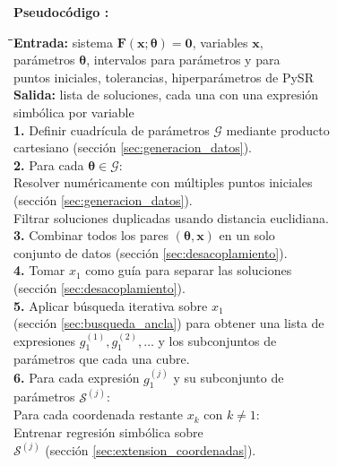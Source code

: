 \documentclass[12pt,a4paper]{article} \usepackage[utf8]{inputenc} \usepackage[spanish]{babel} \usepackage{amsmath, amssymb, amsthm} \usepackage{bm} \usepackage{float} \usepackage{longtable} \usepackage[hidelinks]{hyperref}
\newcommand{\xvec}{\mathbf{x}} \newcommand{\thetavec}{\boldsymbol{\theta}} \newcommand{\Fvec}{\mathbf{F}} \newcommand{\R}{\mathbb{R}} \newcommand{\norm}[1]{\left\lVert#1\right\rVert} \newcommand{\loss}{\mathcal{L}} \newcommand{\dataset}{\mathcal{D}} \newcommand{\jac}{\mathbf{J}}
\begin{document}
\medskip {}\label{alg:proceso_principal} \noindent\textbf{Pseudocódigo \thepseudocode:}
\begin{tabbing}
\qquad \= \qquad \= \qquad \= \kill \textbf{Entrada:} \>\>\> sistema \(\Fvec(\xvec; \thetavec) = \mathbf{0}\), variables \(\xvec\), \\
\>\>\> parámetros \(\thetavec\), intervalos para parámetros y para \\
\>\>\> puntos iniciales, tolerancias, hiperparámetros de PySR \\ \textbf{Salida:} \>\>\> lista de soluciones, cada una con una expresión \\
\>\>\> simbólica por variable \\[4pt] \textbf{1.} \> Definir cuadrícula de parámetros \(\mathcal{G}\) mediante producto \\
\> cartesiano (sección \ref{sec:generacion_datos}). \\
\textbf{2.} \> Para cada \(\thetavec \in \mathcal{G}\): \\
\> \qquad Resolver numéricamente con múltiples puntos iniciales \\ \> \qquad (sección \ref{sec:generacion_datos}). \\ \> \qquad Filtrar soluciones duplicadas usando distancia euclidiana. \\
\textbf{3.} \> Combinar todos los pares \((\thetavec, \xvec)\) en un solo \\
\> conjunto de datos (sección \ref{sec:desacoplamiento}). \\
\textbf{4.} \> Tomar \(x_1\) como guía para separar las soluciones \\
\> (sección \ref{sec:desacoplamiento}). \\
\textbf{5.} \> Aplicar búsqueda iterativa sobre \(x_1\) \\
\> (sección \ref{sec:busqueda_ancla}) para obtener una lista de \\
\> expresiones \(g_1^{(1)}, g_1^{(2)}, \dots\) y los subconjuntos de \\
\> parámetros que cada una cubre. \\
\textbf{6.} \> Para cada expresión \(g_1^{(j)}\) y su subconjunto de \\
\> parámetros \(\mathcal{S}^{(j)}\): \\
\> \qquad Para cada coordenada restante \(x_k\) con \(k \neq 1\): \\
\> \qquad \qquad Entrenar regresión simbólica sobre \\
\> \qquad \qquad \(\mathcal{S}^{(j)}\) (sección \ref{sec:extension_coordenadas}). \\

\end{tabbing}
\end{document}
